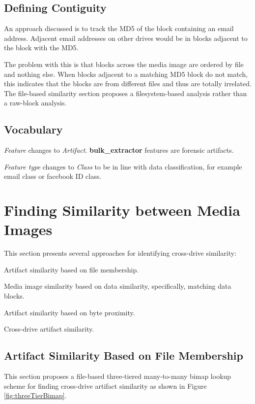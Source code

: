 \documentclass[12pt,twoside]{article}
\newcommand \bulk {\textbf{bulk\_extractor}\xspace}
\begin{document}
\subsection{Defining Contiguity}
An approach discussed is to track the MD5 of the block containing an email address.  Adjacent email addresses on other drives would be in blocks adjacent to the block with the MD5.

The problem with this is that blocks across the media image are ordered by file and nothing else.  When blocks adjacent to a matching MD5 block do not match, this indicates that the blocks are from different files and thus are totally irrelated.  The file-based similarity section proposes a filesystem-based analysis rather than a raw-block analysis.

\subsection{Vocabulary}
\begin{compactitem}
\item \textit{Feature} changes to \textit{Artifact}.  \bulk features are forensic artifacts.
\item \textit{Feature type} changes to \textit{Class} to be in line with data classification, for example email class or facebook ID class.
\end{compactitem}

\section{Finding Similarity between Media Images}
This section presents several approaches for identifying cross-drive similarity:
\begin{compactitem}
\item Artifact similarity based on file membership.
\item Media image similarity based on data similarity, specifically, matching data blocks.
\item Artifact similarity based on byte proximity.
\item Cross-drive artifact similarity.
\end{compactitem}


\subsection{Artifact Similarity Based on File Membership}
This section proposes a file-based three-tiered many-to-many bimap lookup scheme for finding cross-drive artifact similarity as shown in Figure \ref{fig:threeTierBimap}.
\end{document}
